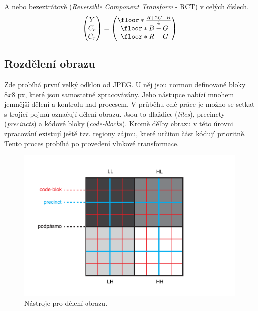 \noindent A nebo bezeztrátově (\textit{Reversible Component Transform} - RCT) v celých číslech.
\begin{gather}
 \begin{pmatrix} Y \\ C_b \\ C_r \end{pmatrix}
 =
 \begin{pmatrix} \floor*{\frac{R + 2G + B}{4}} \\ \floor*{B - G} \\ \floor*{R - G} \end{pmatrix}
\end{gather}

\subsection*{Rozdělení obrazu}
Zde probíhá první velký odklon od JPEG. U něj jsou normou definované bloky $8x8$ px, které jsou samostatně zpracovávány. Jeho nástupce nabízí mnohem jemnější dělení a kontrolu nad procesem. V průběhu celé práce je možno se setkat s trojicí pojmů označují dělení obrazu. Jsou to dlaždice (\textit{tiles}), precincty (\textit{precincts}) a kódové bloky (\textit{code-blocks}). Kromě dělby obrazu v této úrovni zpracování existují ještě tzv. regiony zájmu, které určitou část kódují prioritně. Tento proces probíhá po provedení vlnkové transformace.

\begin{figure}[hbt!]
  \hspace*{-0.5cm}
  \includegraphics[width=16cm]{obrazky-figures/tiles.pdf}
  \caption{Nástroje pro dělení obrazu.}
  \label{retezec}
\end{figure}

